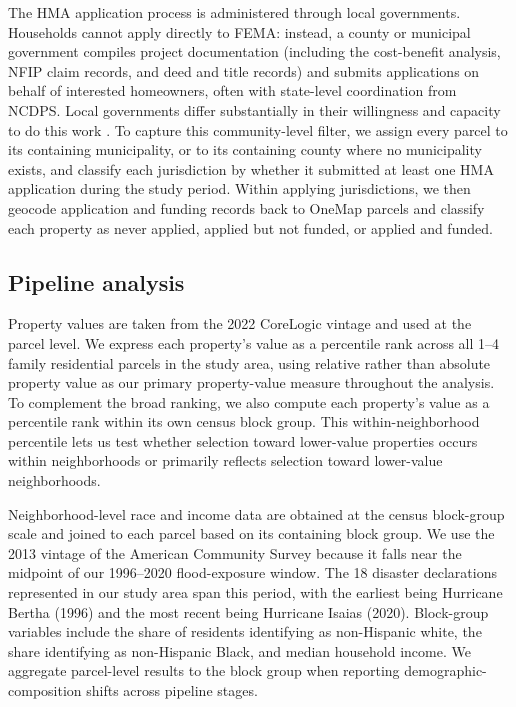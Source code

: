 \documentclass[
  authoryear,
  preprint]{elsarticle}
\begin{document}
The HMA application process is administered through local governments.
Households cannot apply directly to FEMA: instead, a county or municipal
government compiles project documentation (including the cost-benefit
analysis, NFIP claim records, and deed and title records) and submits
applications on behalf of interested homeowners, often with state-level
coordination from NCDPS. Local governments differ substantially in their
willingness and capacity to do this work
\citep{machManagedRetreatVoluntary2019, junodEquitableInvestmentsResilience2021a}.
To capture this community-level filter, we assign every parcel to its
containing municipality, or to its containing county where no
municipality exists, and classify each jurisdiction by whether it
submitted at least one HMA application during the study period. Within
applying jurisdictions, we then geocode application and funding records
back to OneMap parcels and classify each property as never applied,
applied but not funded, or applied and funded.

\subsection{Pipeline analysis}\label{pipeline-analysis}

Property values are taken from the 2022 CoreLogic vintage and used at
the parcel level. We express each property's value as a percentile rank
across all 1--4 family residential parcels in the study area, using
relative rather than absolute property value as our primary
property-value measure throughout the analysis. To complement the broad
ranking, we also compute each property's value as a percentile rank
within its own census block group. This within-neighborhood percentile
lets us test whether selection toward lower-value properties occurs
within neighborhoods or primarily reflects selection toward lower-value
neighborhoods.

Neighborhood-level race and income data are obtained at the census
block-group scale and joined to each parcel based on its containing
block group. We use the 2013 vintage of the American Community Survey
because it falls near the midpoint of our 1996--2020 flood-exposure
window. The 18 disaster declarations represented in our study area span
this period, with the earliest being Hurricane Bertha (1996) and the
most recent being Hurricane Isaias (2020). Block-group variables include
the share of residents identifying as non-Hispanic white, the share
identifying as non-Hispanic Black, and median household income. We
aggregate parcel-level results to the block group when reporting
demographic-composition shifts across pipeline stages.
\end{document}
